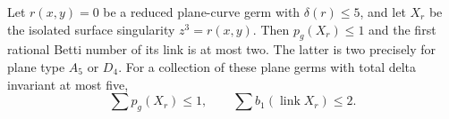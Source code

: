 
\begin{proposition}\label{cdp:st:C.2.RAT.6}
Let $r(x,y)=0$ be a reduced plane-curve germ with
$\delta(r)\le5$, and let $X_r$ be the isolated surface
singularity $z^3=r(x,y)$. Then $p_g(X_r)\le1$ and the
first rational Betti number of its link is at most two.
The latter is two precisely for plane type $A_5$ or $D_4$.
For a collection of these plane germs with total delta
invariant at most five,
\[
             \sum p_g(X_r)\le1,
           \qquad \sum b_1(\operatorname{link}X_r)\le2.
\tag{C.RD.5}\label{cdp:eq:C.RD.5}
\]
\end{proposition}


